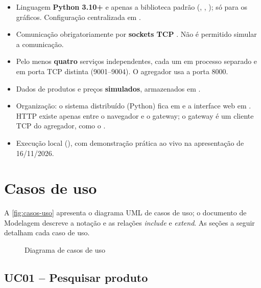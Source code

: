 \begin{itemize}
  \item Linguagem \textbf{Python 3.10+} e apenas a biblioteca padrão (, , );  só para os gráficos. Configuração centralizada em .
  \item Comunicação obrigatoriamente por \textbf{sockets TCP} \cite{kurose2021,python-socket}. Não é permitido simular a comunicação.
  \item Pelo menos \textbf{quatro} serviços independentes, cada um em processo separado e em porta TCP distinta (9001--9004). O agregador usa a porta 8000.
  \item Dados de produtos e preços \textbf{simulados}, armazenados em .
  \item Organização: o sistema distribuído (Python) fica em  e a interface web em . HTTP existe apenas entre o navegador e o gateway; o gateway é um cliente TCP do agregador, como o .
  \item Execução local (), com demonstração prática ao vivo na apresentação de 16/11/2026.
\end{itemize}

\chapter{Casos de uso}

A \autoref{fig:casos-uso} apresenta o diagrama UML de casos de uso; o documento de Modelagem descreve a notação e as relações \textit{include} e \textit{extend}. As seções a seguir detalham cada caso de uso.

\begin{figure}[htb]
  \centering
  \caption{Diagrama de casos de uso}\label{fig:casos-uso}
  \fonteautores
\end{figure}

\section{UC01 -- Pesquisar produto}

